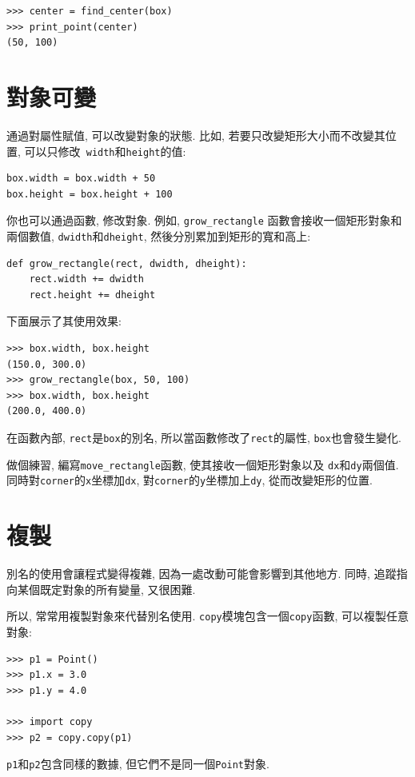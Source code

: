 \documentclass[10pt]{book}
\begin{document}
\begin{verbatim}
>>> center = find_center(box)
>>> print_point(center)
(50, 100)
\end{verbatim}
%

\section{對象可變}

通過對屬性賦值, 可以改變對象的狀態. 
比如, 若要只改變矩形大小而不改變其位置, 可以只修改{\tt
width}和{\tt height}的值:

\begin{verbatim}
box.width = box.width + 50
box.height = box.height + 100
\end{verbatim}
%
你也可以通過函數, 修改對象. 例如, 
\verb"grow_rectangle" 函數會接收一個矩形對象和兩個數值, 
{\tt dwidth}和{\tt dheight}, 然後分別累加到矩形的寬和高上:

\begin{verbatim}
def grow_rectangle(rect, dwidth, dheight):
    rect.width += dwidth
    rect.height += dheight
\end{verbatim}
%
下面展示了其使用效果:

\begin{verbatim}
>>> box.width, box.height
(150.0, 300.0)
>>> grow_rectangle(box, 50, 100)
>>> box.width, box.height
(200.0, 400.0)
\end{verbatim}
%
在函數內部, {\tt rect}是{\tt box}的別名, 所以當函數修改了{\tt rect}的屬性, 
{\tt box}也會發生變化. 

做個練習, 編寫\verb"move_rectangle"函數, 使其接收一個矩形對象以及
{\tt dx}和{\tt dy}兩個值. 
同時對{\tt corner}的{\tt x}坐標加{\tt dx}, 
對{\tt corner}的{\tt y}坐標加上{\tt dy}, 
從而改變矩形的位置. 


\section{複製}
\label{copying}

別名的使用會讓程式變得複雜, 因為一處改動可能會影響到其他地方. 
同時, 追蹤指向某個既定對象的所有變量, 又很困難. 

所以, 常常用複製對象來代替別名使用. 
{\tt copy}模塊包含一個{\tt copy}函數, 可以複製任意對象:

\begin{verbatim}
>>> p1 = Point()
>>> p1.x = 3.0
>>> p1.y = 4.0

>>> import copy
>>> p2 = copy.copy(p1)
\end{verbatim}
%
{\tt p1}和{\tt p2}包含同樣的數據, 但它們不是同一個{\tt Point}對象.
\end{document}
